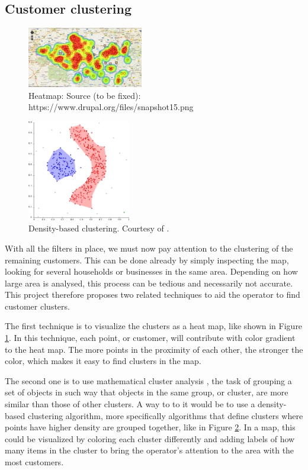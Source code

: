 \documentclass[twocolumn]{article}
\begin{document}
\subsection{Customer clustering}
\label{sub:Customer clustering}
\begin{figure}
  \centering
  \includegraphics[width=0.45\textwidth]{img/heatmap.png}
  \caption{Heatmap: Source (to be fixed): https://www.drupal.org/files/snapshot15.png}
  \label{fig:heatmap}
\end{figure}
\begin{figure}
  \centering
  \includegraphics[width=0.40\textwidth]{img/dbscan.png}
  \caption{Density-based clustering. Courtesy of \cite{Wikipedia_contributors2014-qv}.}
  \label{fig:dbscan}
\end{figure}
With all the filters in place, we must now pay attention to the clustering of the remaining customers. This can be done already by simply inspecting the map, looking for several households or businesses in the same area. Depending on how large area is analysed, this process can be tedious and necessarily not accurate. This project therefore proposes two related techniques to aid the operator to find customer clusters.

The first technique is to visualize the clusters as a heat map, like shown in Figure \ref{fig:heatmap}. In this technique, each point, or customer, will contribute with color gradient to the heat map. The more points in the proximity of each other, the stronger the color, which makes it easy to find clusters in the map.

The second one is to use mathematical cluster analysis \cite{Wikipedia_contributors2014-qv}, the task of grouping a set of objects in such way that objects in the same group, or cluster, are more similar than those of other clusters. A way to to it would be to use a density-based clustering algorithm, more specifically algorithms that define clusters where points have higher density are grouped together, like in Figure \ref{fig:dbscan}. In a map, this could be visualized by coloring each cluster differently and adding labels of how many items in the cluster to bring the operator's attention to the area with the most customers.
\end{document}
